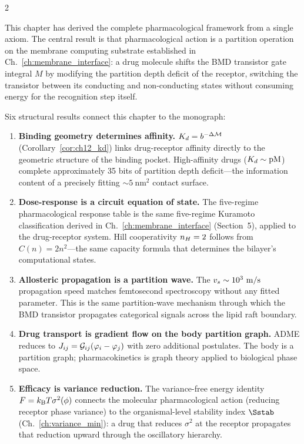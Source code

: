 \begin{multicols}{2}

This chapter has derived the complete pharmacological framework from a single axiom. The central result is that pharmacological action is a partition operation on the membrane computing substrate established in Ch.~\ref{ch:membrane_interface}: a drug molecule shifts the BMD transistor gate integral $M$ by modifying the partition depth deficit of the receptor, switching the transistor between its conducting and non-conducting states without consuming energy for the recognition step itself.

Six structural results connect this chapter to the monograph:

\begin{enumerate}

\item \textbf{Binding geometry determines affinity.} $K_d = b^{-\Delta\mathcal{M}}$ (Corollary~\ref{cor:ch12_kd}) links drug-receptor affinity directly to the geometric structure of the binding pocket. High-affinity drugs ($K_d \sim \mathrm{pM}$) complete approximately 35 bits of partition depth deficit---the information content of a precisely fitting $\sim 5\ \mathrm{nm}^2$ contact surface.

\item \textbf{Dose-response is a circuit equation of state.} The five-regime pharmacological response table is the same five-regime Kuramoto classification derived in Ch.~\ref{ch:membrane_interface} (Section~5), applied to the drug-receptor system. Hill cooperativity $n_H = 2$ follows from $C(n) = 2n^2$---the same capacity formula that determines the bilayer's computational states.

\item \textbf{Allosteric propagation is a partition wave.} The $v_s \sim 10^3\ \mathrm{m/s}$ propagation speed matches femtosecond spectroscopy without any fitted parameter. This is the same partition-wave mechanism through which the BMD transistor propagates categorical signals across the lipid raft boundary.

\item \textbf{Drug transport is gradient flow on the body partition graph.} ADME reduces to $J_{ij} = \mathcal{G}_{ij}(\varphi_i - \varphi_j)$ with zero additional postulates. The body is a partition graph; pharmacokinetics is graph theory applied to biological phase space.

\item \textbf{Efficacy is variance reduction.} The variance-free energy identity $F = k_{\mathrm{B}} T\sigma^2(\phi)$ connects the molecular pharmacological action (reducing receptor phase variance) to the organismal-level stability index $\Sstab$ (Ch.~\ref{ch:variance_min}): a drug that reduces $\sigma^2$ at the receptor propagates that reduction upward through the oscillatory hierarchy.


\end{enumerate}
\end{multicols}
